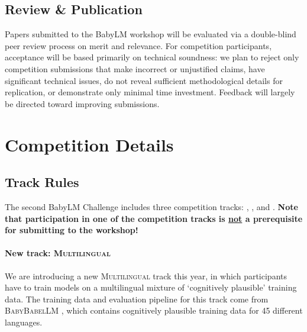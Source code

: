 \documentclass[11pt]{article}
\newcommand{\strict}[1]{\textsc{Strict}}
\newcommand{\strictsmall}[1]{\textsc{Strict-small}}
\newcommand{\multilingual}[1]{\textsc{Multilingual}}
\begin{document}
\subsection{Review \& Publication}
Papers submitted to the BabyLM workshop will be evaluated via a double-blind peer review process on merit and relevance. For competition participants, acceptance will be based primarily on technical soundness: we plan to reject only competition submissions that make incorrect or unjustified claims, have significant technical issues, do not reveal sufficient methodological details for replication, or demonstrate only minimal time investment. Feedback will largely be directed toward improving submissions.




\section{Competition Details} %

\subsection{Track Rules}
\label{sec:track_rules}
The second BabyLM Challenge includes three competition tracks: \textbf{\strict}, \textbf{\strictsmall}, and \textbf{\multilingual}.
\textbf{Note that participation in one of the competition tracks is \underline{not} a prerequisite for submitting to the workshop!}

\paragraph{New track: \multilingual{}}
We are introducing a new \multilingual{} track this year, in which participants have to train models on a multilingual mixture of `cognitively plausible' training data.
The training data and evaluation pipeline for this track come from \textsc{BabyBabelLM} \citep{DBLP:journals/corr/abs-2510-10159}, which contains cognitively plausible training data for 45 different languages.
\end{document}
